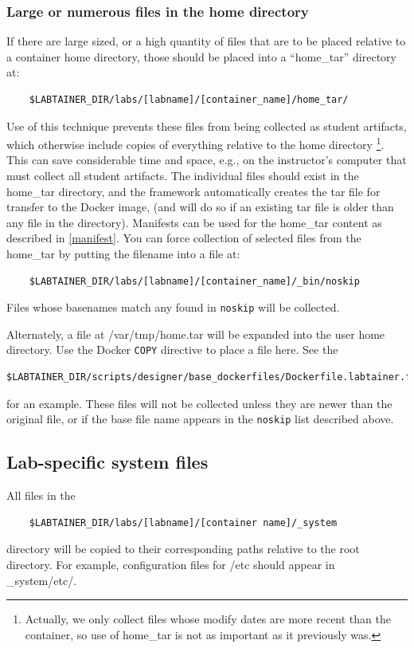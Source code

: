 \documentclass[12pt]{article}
\begin{document}
\subsubsection{Large or numerous files in the home directory} \label{large files}
If there are large sized, or a high quantity of files that are to be placed relative to a 
container home directory, those should be placed into a ``home\_tar'' directory at:
\begin{verbatim}
    $LABTAINER_DIR/labs/[labname]/[container_name]/home_tar/
\end{verbatim}
\noindent Use of this technique prevents these files from being collected as student artifacts, which
otherwise include copies of everything relative to the home directory \footnote{Actually, we only collect
files whose modify dates are more recent than the container, so use of home\_tar is not as
important as it previously was.}.  This
can save considerable time and space, e.g., on the instructor's computer that must collect
all student artifacts.
The individual files should exist in the home\_tar directory, and the framework automatically
creates the tar file for transfer to the Docker image, (and will do so if an existing tar file
is older than any file in the directory).  Manifests can be used for the home\_tar content
as described in \ref{manifest}.  You can force collection of selected files from the home\_tar
by putting the filename into a file at:
\begin{verbatim}
    $LABTAINER_DIR/labs/[labname]/[container_name]/_bin/noskip
\end{verbatim}
\noindent  Files whose basenames match any found in {\tt noskip} will be collected.

Alternately, a file at /var/tmp/home.tar will be expanded into the user home directory.
Use the Docker {\tt COPY} directive to place a file here.  See the 
\begin{verbatim}
$LABTAINER_DIR/scripts/designer/base_dockerfiles/Dockerfile.labtainer.firefox
\end{verbatim}
for an example.  These files will not be collected unless they are newer than the original file,
or if the base file name appears in the {\tt noskip} list described above.

\subsection{Lab-specific system files}
All files in the
\begin{verbatim}
    $LABTAINER_DIR/labs/[labname]/[container name]/_system
\end{verbatim}
\noindent directory will be copied to their corresponding paths relative to the root directory.
For example, configuration files for /etc should appear in \_system/etc/.
\end{document}
